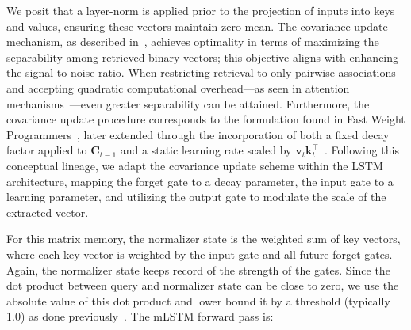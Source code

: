 We posit that a layer-norm is applied prior to the projection of inputs into keys and values, ensuring these vectors maintain zero mean. The covariance update mechanism, as described in~\citep{Dayan:91}, achieves optimality in terms of maximizing the separability among retrieved binary vectors; this objective aligns with enhancing the signal-to-noise ratio. When restricting retrieval to only pairwise associations and accepting quadratic computational overhead—as seen in attention mechanisms~\citep{Krotov:16,Krotov:17,Ramsauer:21}—even greater separability can be attained. Furthermore, the covariance update procedure corresponds to the formulation found in Fast Weight Programmers~\citep{Schmidhuber:92ncfastweights,Schlag:21}, later extended through the incorporation of both a fixed decay factor applied to $\mathbf{C}_{t-1}$ and a static learning rate scaled by 
$\mathbf{v}_{t} \mathbf{k}_t ^\top$~\citep{Ba:16}.
Following this conceptual lineage, we adapt the covariance update scheme within the LSTM architecture, mapping the forget gate to a decay parameter, the input gate to a learning parameter, and utilizing the output gate to modulate the scale of the extracted vector.

For this matrix memory, the normalizer state is the weighted sum of key vectors, where each key vector is weighted by the input gate and all future forget gates. Again, the normalizer state keeps record of the strength of the gates. Since the dot product between query and normalizer state can be close to zero, we use the absolute value of this dot product and lower bound it by a threshold (typically 1.0) as done previously~\citep{Sun:23arxiv}. The mLSTM forward pass is:

